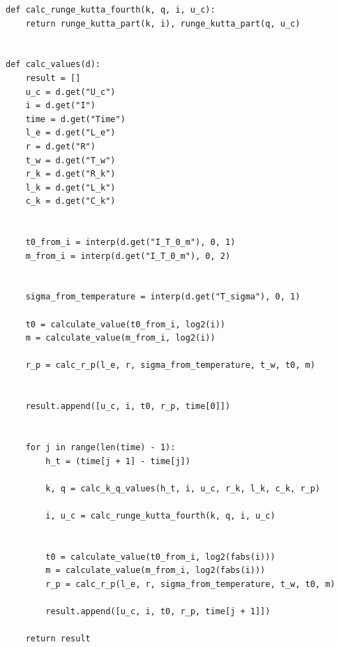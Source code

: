 \documentclass[a4paper,12pt]{article}
\begin{document}
\begin{lstlisting}[label=lst1,caption=Реализация метода Рунге-Кутта 4-ого порядка точности]
def calc_runge_kutta_fourth(k, q, i, u_c):
	return runge_kutta_part(k, i), runge_kutta_part(q, u_c)


def calc_values(d):
	result = []
	u_c = d.get("U_c")
	i = d.get("I")
	time = d.get("Time")
	l_e = d.get("L_e")
	r = d.get("R")
	t_w = d.get("T_w")
	r_k = d.get("R_k")
	l_k = d.get("L_k")
	c_k = d.get("C_k")
	
	
	t0_from_i = interp(d.get("I_T_0_m"), 0, 1)
	m_from_i = interp(d.get("I_T_0_m"), 0, 2)
	
	
	sigma_from_temperature = interp(d.get("T_sigma"), 0, 1)
	
	t0 = calculate_value(t0_from_i, log2(i))
	m = calculate_value(m_from_i, log2(i))
	
	r_p = calc_r_p(l_e, r, sigma_from_temperature, t_w, t0, m)
	
	
	result.append([u_c, i, t0, r_p, time[0]])
	
	
	for j in range(len(time) - 1):
		h_t = (time[j + 1] - time[j])
	
		k, q = calc_k_q_values(h_t, i, u_c, r_k, l_k, c_k, r_p)
		
		i, u_c = calc_runge_kutta_fourth(k, q, i, u_c)
		
		
		t0 = calculate_value(t0_from_i, log2(fabs(i)))
		m = calculate_value(m_from_i, log2(fabs(i)))
		r_p = calc_r_p(l_e, r, sigma_from_temperature, t_w, t0, m)
		
		result.append([u_c, i, t0, r_p, time[j + 1]])
	
	return result
\end{lstlisting}
\end{document}
